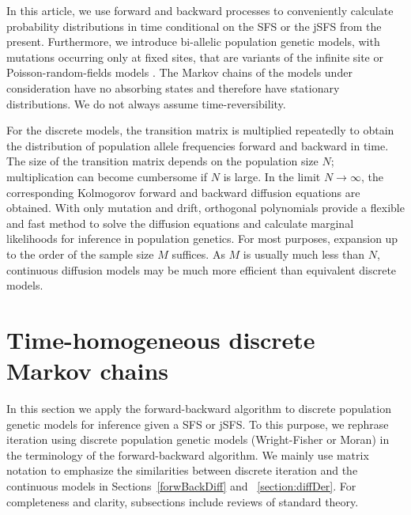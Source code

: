 \documentclass[preprint]{elsarticle}
\begin{document}
In this article, we use forward and backward processes to conveniently calculate probability distributions in time conditional on the SFS or the jSFS from the present. %
Furthermore, we introduce bi-allelic population genetic models, with mutations occurring only at fixed sites, that are variants of the infinite site or Poisson-random-fields models \citep{Kimu69,Sawy92}. The Markov chains of the models under consideration have no absorbing states and therefore have stationary distributions. We do not always assume time-reversibility.

For the discrete models, the transition matrix is multiplied repeatedly to obtain the distribution of population allele frequencies forward and backward in time. The size of the transition matrix depends on the population size $N$; multiplication can become cumbersome if $N$ is large. In the limit $N\to\infty$, the corresponding Kolmogorov forward and backward diffusion equations are obtained. With only mutation and drift, orthogonal polynomials provide a flexible and fast method to solve the diffusion equations and calculate marginal likelihoods for inference in population genetics. For most purposes, expansion up to the order of the sample size $M$ suffices. As $M$ is usually much less than $N$, continuous diffusion models may be much more efficient than equivalent discrete models.

\section{Time-homogeneous discrete Markov chains}

In this section we apply the forward-backward algorithm \citep{Rabi86} to discrete population genetic models for inference given a SFS or jSFS. To this purpose, we rephrase iteration using discrete population genetic models (Wright-Fisher or Moran) in the terminology of the forward-backward algorithm. We mainly use matrix notation to emphasize the similarities between discrete iteration and the continuous models in Sections~\ref{forwBackDiff} and ~\ref{section:diffDer}. For completeness and clarity, subsections include reviews of standard theory. 
\end{document}
